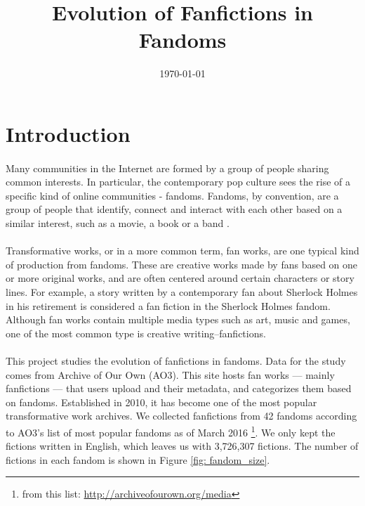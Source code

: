 \documentclass[11pt]{article} %
\begin{document}

\title{Evolution of Fanfictions in Fandoms} %
\date{\today}
\maketitle %

\section{Introduction} %
\label{sec:introduction}
\paragraph{} Many communities in the Internet are formed by a group of people sharing common interests. In particular, the contemporary pop culture sees the rise of a specific kind of online communities - fandoms. Fandoms, by convention, are a group of people that identify, connect and interact with each other based on a similar interest, such as a movie, a book or a band \cite{wiki:fandom}. 

\paragraph{}Transformative works, or in a more common term, fan works, are one typical kind of production from fandoms\cite{wiki:transf_work}. These are creative works made by fans based on one or more original works, and are often centered around certain characters or story lines. For example, a story written by a contemporary fan about Sherlock Holmes in his retirement is considered a fan fiction in the Sherlock Holmes fandom. Although fan works contain multiple media types such as art, music and games, one of the most common type is creative writing--fanfictions.

\paragraph{} This project studies the evolution of fanfictions in fandoms. Data for the study comes from Archive of Our Own (AO3). This site hosts fan works --- mainly fanfictions --- that users upload and their metadata, and categorizes them based on fandoms. Established in 2010, it has become one of the most popular transformative work archives. We collected fanfictions from 42 fandoms according to AO3's list of most popular fandoms as of March 2016 \footnote{from this list: \url{http://archiveofourown.org/media}}. We only kept the fictions written in English, which leaves us with 3,726,307 fictions. The number of fictions in each fandom is shown in Figure \ref{fig: fandom_size}.
\end{document}
